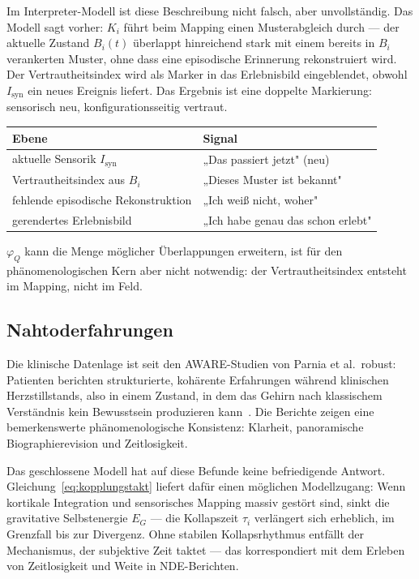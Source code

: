 \documentclass[11pt,a4paper]{article}
\begin{document}
Im Interpreter-Modell ist diese Beschreibung nicht falsch, aber unvollständig.
Das Modell sagt vorher: $K_i$ führt beim Mapping einen Musterabgleich durch —
der aktuelle Zustand $B_i(t)$ überlappt hinreichend stark mit einem bereits in
$B_i$ verankerten Muster, ohne dass eine episodische Erinnerung rekonstruiert
wird. Der Vertrautheitsindex wird als Marker in das Erlebnisbild eingeblendet,
obwohl $I_{\mathrm{syn}}$ ein neues Ereignis liefert. Das Ergebnis ist eine
doppelte Markierung: sensorisch neu, konfigurationsseitig vertraut.

\medskip
\begin{center}\small
\begin{tabular}{@{}ll@{}}
\toprule
Ebene & Signal \\
\midrule
aktuelle Sensorik $I_{\mathrm{syn}}$ & „Das passiert jetzt" (neu) \\
Vertrautheitsindex aus $B_i$         & „Dieses Muster ist bekannt" \\
fehlende episodische Rekonstruktion  & „Ich weiß nicht, woher" \\
gerendertes Erlebnisbild             & „Ich habe genau das schon erlebt" \\
\bottomrule
\end{tabular}
\end{center}
\medskip

$\varphi_Q$ kann die Menge möglicher Überlappungen erweitern, ist für den
phänomenologischen Kern aber nicht notwendig: der Vertrautheitsindex
entsteht im Mapping, nicht im Feld.

\subsection{Nahtoderfahrungen}

Die klinische Datenlage ist seit den AWARE-Studien von Parnia et al.\ robust:
Patienten berichten strukturierte, kohärente Erfahrungen während klinischen
Herzstillstands, also in einem Zustand, in dem das Gehirn nach klassischem
Verständnis kein Bewusstsein produzieren kann~\citep{parnia2014,parnia2023,sartori2008}.
Die Berichte zeigen eine bemerkenswerte phänomenologische Konsistenz: Klarheit,
panoramische Biographierevision und Zeitlosigkeit.

Das geschlossene Modell hat auf diese Befunde keine befriedigende Antwort.
Gleichung~\eqref{eq:kopplungstakt} liefert dafür einen möglichen Modellzugang:
Wenn kortikale Integration und sensorisches Mapping massiv gestört sind,
sinkt die gravitative Selbstenergie $E_G$ — die Kollapszeit $\tau_i$
verlängert sich erheblich, im Grenzfall bis zur Divergenz. Ohne stabilen
Kollapsrhythmus entfällt der Mechanismus, der subjektive Zeit taktet —
das korrespondiert mit dem Erleben von Zeitlosigkeit und Weite in NDE-Berichten.
\end{document}
